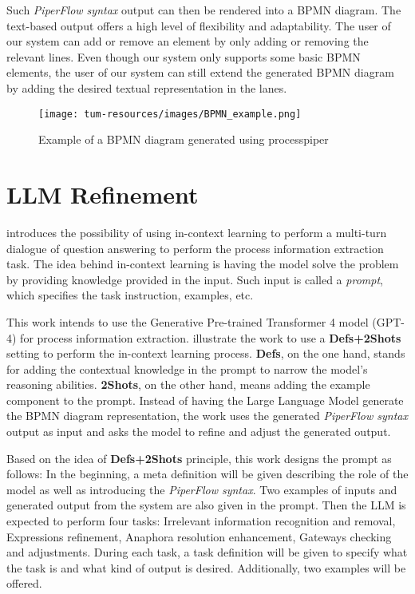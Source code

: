 Such \textit{PiperFlow syntax} output can then be rendered into a BPMN diagram. The text-based output offers a high level of flexibility and adaptability. The user of our system can add or remove an element by only adding or removing the relevant lines. Even though our system only supports some basic BPMN elements, the user of our system can still extend the generated BPMN diagram by adding the desired textual representation in the lanes.

\begin{figure}[h]
    \centering
    \caption{Example of a BPMN diagram generated using processpiper}
    \texttt{[image: tum-resources/images/BPMN\_example.png]}
\end{figure}

\section{LLM Refinement}
\cite{LLM_1} introduces the possibility of using in-context learning to perform a multi-turn dialogue of question answering to perform the process information extraction task. The idea behind in-context learning is having the model solve the problem by providing knowledge provided in the input. Such input is called a \textit{prompt}, which specifies the task instruction, examples, etc. 

This work intends to use the Generative Pre-trained Transformer 4 model (GPT-4) for process information extraction.\cite{LLM_1} illustrate the work to use a \textbf{Defs+2Shots} setting to perform the in-context learning process. \textbf{Defs}, on the one hand, stands for adding the contextual knowledge in the prompt to narrow the model's reasoning abilities. \textbf{2Shots}, on the other hand, means adding the example component to the prompt. Instead of having the Large Language Model generate the BPMN diagram representation, the work uses the generated \textit{PiperFlow syntax} output as input and asks the model to refine and adjust the generated output.

Based on the idea of \textbf{Defs+2Shots} principle, this work designs the prompt as follows: In the beginning, a meta definition will be given describing the role of the model as well as introducing the \textit{PiperFlow syntax}. Two examples of inputs and generated output from the system are also given in the prompt. Then the LLM is expected to perform four tasks: Irrelevant information recognition and removal, Expressions refinement, Anaphora resolution enhancement, Gateways checking and adjustments. During each task, a task definition will be given to specify what the task is and what kind of output is desired. Additionally, two examples will be offered. 

